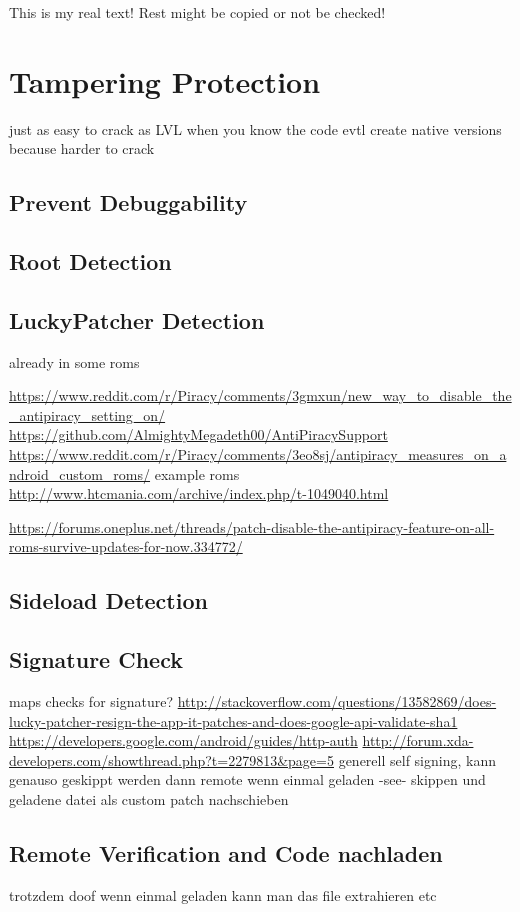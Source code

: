 This is my real text! Rest might be copied or not be checked!



\section{Tampering Protection} \label{section:evaluation-tampering}

just as easy to crack as LVL when you know the code\newline
evtl create native versions because harder to crack\newline

\subsection{Prevent Debuggability} \label{subsection:tampering-debuggable}
\subsection{Root Detection} \label{subsection:tampering-root}
\subsection{LuckyPatcher Detection} \label{subsection:tampering-luckypatcher}
already in some roms

 \url{https://www.reddit.com/r/Piracy/comments/3gmxun/new_way_to_disable_the_antipiracy_setting_on/}\newline
\url{https://github.com/AlmightyMegadeth00/AntiPiracySupport}\newline
\url{https://www.reddit.com/r/Piracy/comments/3eo8sj/antipiracy_measures_on_android_custom_roms/}\newline
example roms \url{http://www.htcmania.com/archive/index.php/t-1049040.html}\newline

\url{https://forums.oneplus.net/threads/patch-disable-the-antipiracy-feature-on-all-roms-survive-updates-for-now.334772/}
\subsection{Sideload Detection} \label{subsection:tampering-sideload}
\subsection{Signature Check} \label{subsection:tampering-signature}
maps checks for signature?\newline
\url{http://stackoverflow.com/questions/13582869/does-lucky-patcher-resign-the-app-it-patches-and-does-google-api-validate-sha1}\newline
\url{https://developers.google.com/android/guides/http-auth}
\url{http://forum.xda-developers.com/showthread.php?t=2279813&page=5}\newline
generell\newline
self signing, kann genauso geskippt werden dann
remote\newline
wenn einmal geladen -see- skippen und geladene datei als custom patch nachschieben
\subsection{Remote Verification and Code nachladen} \label{subsection:external-remote}
trotzdem doof wenn einmal geladen kann man das file extrahieren etc
